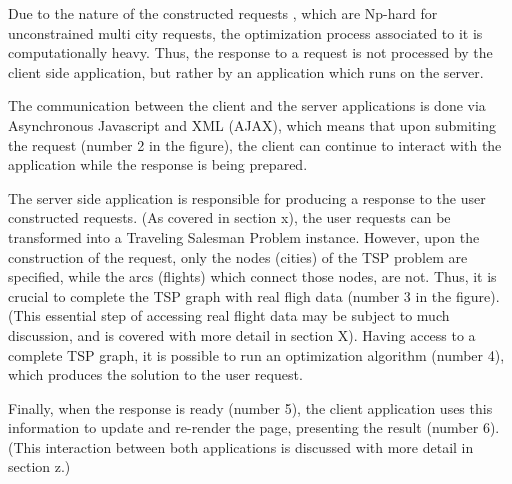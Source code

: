 Due to the nature of the constructed requests , which are Np-hard for unconstrained multi city requests,
the optimization process associated to it is computationally heavy.
Thus, the response to a request is not processed by the client side application,
but rather by an application which runs on the server.



The communication between the client and the server applications  
is done via Asynchronous Javascript and XML (AJAX),
which means that upon submiting the request (number 2 in the figure),
the client can continue to interact with the application 
while the response is being prepared.


The server side application is responsible for producing a 
response to the user constructed requests.
(As covered in section x), the user requests can be transformed into a Traveling Salesman Problem instance.
However, upon the construction of the request, only the nodes (cities) of the TSP problem are specified,
while the arcs (flights) which connect those nodes, are not.
Thus, it is crucial to complete the TSP graph with real fligh data (number 3 in the figure).
(This essential step of accessing real flight data may be subject to much discussion,
and is covered with more detail in section X).
Having access to a complete TSP graph, it is possible to run an optimization algorithm (number 4),
which produces the solution to the user request.

Finally, when the response is ready (number 5),
the client application uses this information to update and re-render the page, presenting the result (number 6).
(This interaction between both applications is discussed with more detail in section z.)
